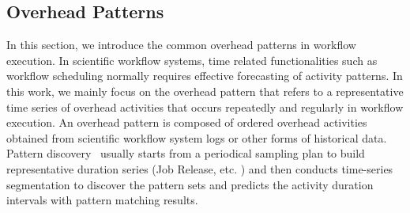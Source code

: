\documentclass[final,5p,times,twocolumn]{elsarticle}
\begin{document}











\subsection{Overhead Patterns}

In this section, we introduce the common overhead patterns in workflow execution. 
In scientific workflow systems, time related functionalities such as workflow scheduling normally requires effective forecasting of activity patterns. In this work, we mainly focus on the overhead pattern that refers to a representative time series of overhead activities that occurs repeatedly and regularly in workflow execution. An overhead pattern is composed of ordered overhead activities obtained from scientific workflow system logs or other forms of historical data. 
Pattern discovery~\cite{Liu2008} usually starts from a periodical sampling plan to build representative duration series (Job Release, etc. ) and then conducts time-series segmentation to discover the pattern sets and predicts the activity duration intervals with pattern matching results. 
\end{document}
